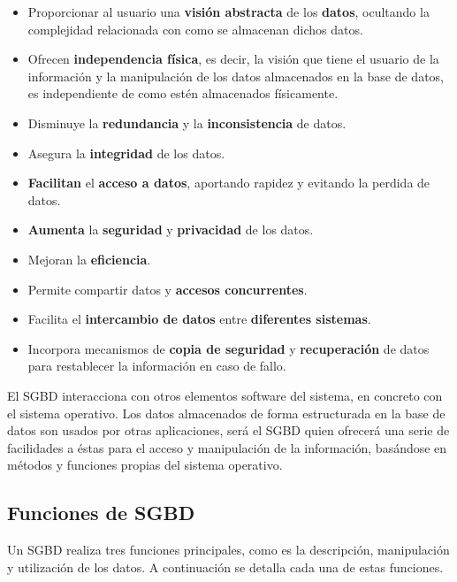 \begin{itemize}
    \item Proporcionar al usuario una \textbf{visión abstracta} de los \textbf{datos}, ocultando la complejidad relacionada con como se almacenan dichos datos.

    \item Ofrecen \textbf{independencia física}, es decir, la visión que tiene el usuario de la información y la manipulación de los datos almacenados en la base de datos, es independiente de como estén almacenados físicamente.

    \item Disminuye la \textbf{\gls{redundancia}} y la \textbf{\gls{inconsistencia}} de datos.

    \item Asegura la \textbf{\gls{integridad}} de los datos.

    \item \textbf{Facilitan} el \textbf{acceso a datos}, aportando rapidez y evitando la perdida de datos.

    \item \textbf{Aumenta} la \textbf{seguridad} y \textbf{privacidad} de los datos.

    \item Mejoran la \textbf{eficiencia}.

    \item Permite compartir datos y \textbf{accesos concurrentes}.

    \item Facilita el \textbf{intercambio de datos} entre \textbf{diferentes sistemas}.

    \item Incorpora mecanismos de \textbf{copia de seguridad} y \textbf{recuperación} de datos para restablecer la información en caso de fallo.
\end{itemize}

El SGBD interacciona con otros elementos software del sistema, en concreto con el sistema operativo. Los datos almacenados de forma estructurada en la base de datos son usados por otras aplicaciones, será el SGBD quien ofrecerá una serie de facilidades a éstas para el acceso y manipulación de la información, basándose en métodos y funciones propias del sistema operativo.

\subsection{Funciones de SGBD}
Un SGBD realiza tres funciones principales, como es la descripción, manipulación y utilización de los datos. A continuación se detalla cada una de estas funciones.


